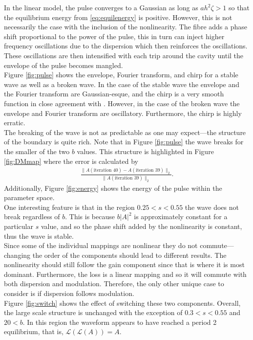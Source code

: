 In the linear model, the pulse converges to a Gaussian as long as $a h^2 \zeta > 1$ so that the equilibrium energy from \eqref{eq:equilenergy} is positive. However, this is not necessarily the case with the inclusion of the nonlinearity. The fibre adds a phase shift proportional to the power of the pulse, this in turn can inject higher frequency oscillations due to the dispersion which then reinforces the oscillations. These oscillations are then intensified with each trip around the cavity until the envelope of the pulse becomes mangled. \\

Figure \ref{fig:pulse} shows the envelope, Fourier transform, and chirp for a stable wave as well as a broken wave. In the case of the stable wave the envelope and the Fourier transform are Gaussian-esque, and the chirp is a very smooth function in close agreement with \cite{chen}. However, in the case of the broken wave the envelope and Fourier transform are oscillatory. Furthermore, the chirp is highly erratic. \\

The breaking of the wave is not as predictable as one may expect---the structure of the boundary is quite rich. Note that in Figure \ref{fig:pulse} the wave breaks for the smaller of the two $b$ values. This structure is highlighted in Figure \ref{fig:DMmap} where the error is calculated by
\begin{align*}
\frac{\|A(\text{iteration } 40) - A(\text{iteration } 39) \|_2}{\|A(\text{iteration } 39) \|_2}.
\end{align*}
Additionally, Figure \ref{fig:energy} shows the energy of the pulse within the parameter space. \\

One interesting feature is that in the region $0.25 < s < 0.55$ the wave does not break regardless of $b$. This is because $b|A|^2$ is approximately constant for a particular $s$ value, and so the phase shift added by the nonlinearity is constant, thus the wave is stable. \\

Since some of the individual mappings are nonlinear they do not commute---changing the order of the components should lead to different results. The nonlinearity should still follow the gain component since that is where it is most dominant. Furthermore, the loss is a linear mapping and so it will commute with both dispersion and modulation. Therefore, the only other unique case to consider is if dispersion follows modulation. \\

Figure \ref{fig:switch} shows the effect of switching these two components. Overall, the large scale structure is unchanged with the exception of $0.3 < s < 0.55$ and $20 < b$. In this region the waveform appears to have reached a period 2 equilibrium, that is, $\mathcal{L}(\mathcal{L}(A)) = A$.
